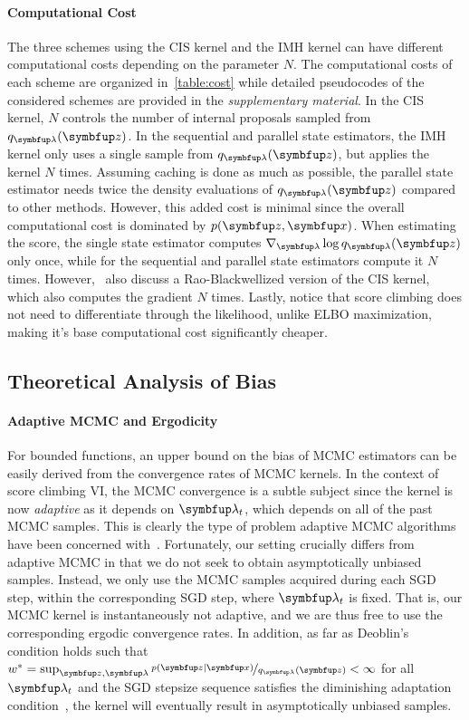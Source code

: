 \paragraph{Computational Cost}
The three schemes using the CIS kernel and the IMH kernel can have different computational costs depending on the parameter \(N\).
The computational costs of each scheme are organized in~\cref{table:cost} while detailed pseudocodes of the considered schemes are provided in the \textit{supplementary material}.
In the CIS kernel, \(N\) controls the number of internal proposals sampled from \(q_{\vlambda}(\vz)\).
In the sequential and parallel state estimators, the IMH kernel only uses a single sample from \(q_{\vlambda}(\vz)\), but applies the kernel \(N\) times.
Assuming caching is done as much as possible, the parallel state estimator needs twice the density evaluations of \(q_{\vlambda}(\vz)\) compared to other methods.
However, this added cost is minimal since the overall computational cost is dominated by  \(p(\vz,\vx)\).
When estimating the score, the single state estimator computes \(\nabla_{\vlambda} \log q_{\vlambda}(\vz)\) only once, while for the sequential and parallel state estimators compute it \(N\) times.
However,~\cite{NEURIPS2020_b2070693} also discuss a Rao-Blackwellized version of the CIS kernel, which also computes the gradient \(N\) times.
Lastly, notice that score climbing does not need to differentiate through the likelihood, unlike ELBO maximization, making it's base computational cost significantly cheaper.

\subsection{Theoretical Analysis of Bias}\label{section:theory}
\vspace{-0.05in}
\paragraph{Adaptive MCMC and Ergodicity}
For bounded functions, an upper bound on the bias of MCMC estimators can be easily derived from the convergence rates of MCMC kernels.
In the context of score climbing VI, the MCMC convergence is a subtle subject since the kernel is now \textit{adaptive} as it depends on \(\vlambda_t\), which depends on all of the past MCMC samples.
This is clearly the type of problem adaptive MCMC algorithms have been concerned with~\citep{andrieu_ergodicity_2006}.
Fortunately, our setting crucially differs from adaptive MCMC in that we do not seek to obtain asymptotically unbiased samples.
Instead, we only use the MCMC samples acquired during each SGD step, within the corresponding SGD step, where \(\vlambda_t\) is fixed.
That is, our MCMC kernel is instantaneously not adaptive, and we are thus free to use the corresponding ergodic convergence rates.
In addition, as far as Deoblin's condition holds such that \(w^* = \sup_{\vz, \vlambda} \nicefrac{p\left(\vz\mid\vx\right)}{q_{\vlambda}\left(\vz\right)}  < \infty\) for all \(\vlambda_t\) and the SGD stepsize sequence satisfies the diminishing adaptation condition~\citep{10.2307/27595854}, the kernel will eventually result in asymptotically unbiased samples.

